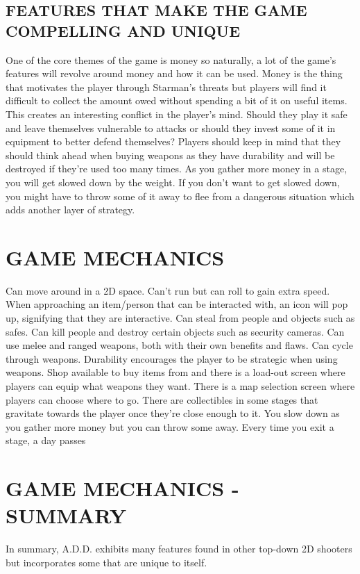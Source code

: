 \documentclass{article}
\begin{document}
\subsection{FEATURES THAT MAKE THE GAME COMPELLING AND UNIQUE \label{features}}
One of the core themes of the game is money so naturally, a lot of the game's features will revolve around money and how it can be used. Money is the thing that motivates the player through Starman's threats but players will find it difficult to collect the amount owed without spending a bit of it on useful items. This creates an interesting conflict in the player's mind. Should they play it safe and leave themselves vulnerable to attacks or should they invest some of it in equipment to better defend themselves? Players should keep in mind that they should think ahead when buying weapons as they have durability and will be destroyed if they're used too many times. As you gather more money in a stage, you will get slowed down by the weight. If you don't want to get slowed down, you might have to throw some of it away to flee from a dangerous situation which adds another layer of strategy. 

\section{GAME MECHANICS \label{mechanics}}
Can move around in a 2D space. Can't run but can roll to gain extra speed. When approaching an item/person that can be interacted with, an icon will pop up, signifying that they are interactive. Can steal from people and objects such as safes. Can kill people and destroy certain objects such as security cameras. Can use melee and ranged weapons, both with their own benefits and flaws. Can cycle through weapons. Durability encourages the player to be strategic when using weapons. Shop available to buy items from and there is a load-out screen where players can equip what weapons they want. There is a map selection screen where players can choose where to go. There are collectibles in some stages that gravitate towards the player once they're close enough to it. You slow down as you gather more money but you can throw some away. Every time you exit a stage, a day passes 

\section{GAME MECHANICS - SUMMARY \label{mechanicssumm}}
In summary, A.D.D. exhibits many features found in other top-down 2D shooters but incorporates some that are unique to itself.
\end{document}
